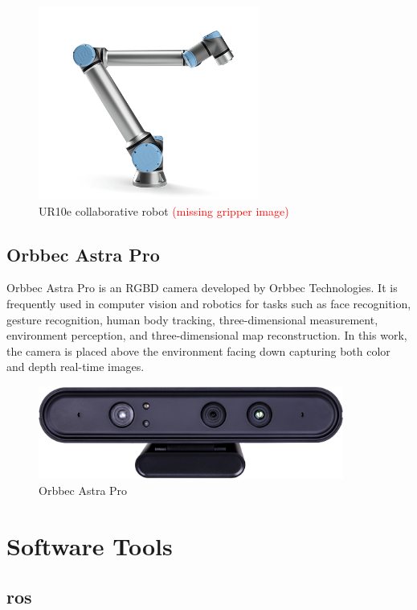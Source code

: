 \begin{figure}[h]
\centerline{\includegraphics[height=2.5in]{figs/UR10e.png}}
\caption[UR10e]{UR10e collaborative robot \cite{UR10e_image} \textcolor{red}{(missing gripper image)}}
\label{fig:ur10e}
\end{figure}

\subsection{Orbbec Astra Pro}

Orbbec Astra Pro is an RGBD camera developed by Orbbec Technologies. It is frequently used in computer vision and robotics for tasks such as face recognition, gesture recognition, human body tracking, three-dimensional measurement, environment perception, and three-dimensional map reconstruction\cite{AstraPro}. In this work, the camera is placed above the environment facing down capturing both color and depth real-time images.

\begin{figure}[h]
\centerline{\includegraphics[height=1.2in]{figs/Astra.jpg}}
\caption[Orbbec Astra Pro]{Orbbec Astra Pro \cite{AstraPro}}
\label{fig:orbbec_astra_pro}
\end{figure}

\section{Software Tools}

\subsection{\acf{ros}}

